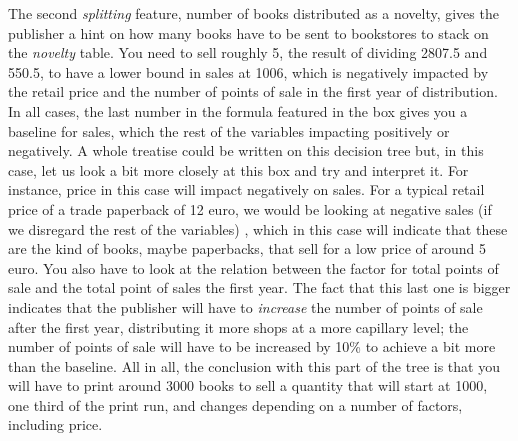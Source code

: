 \documentclass[a4paper,10pt,twocolumn,preprint,3p]{elsarticle}
\begin{document}
The second {\em splitting} feature, number of books distributed as a
novelty, gives the publisher a hint on how many books have to be sent
to bookstores to stack on the {\em novelty} table. You need to sell
roughly 5, the result of dividing 2807.5 and 550.5, to have a lower
bound in sales at 1006, which is negatively impacted by the retail
price and the number of points of sale in the first year of
distribution. In all cases, the last number in the formula featured in
the box gives you a baseline for sales, which the rest of the
variables impacting positively or negatively. A whole treatise could
be written on this decision tree but, in this case, let us look a bit
more closely at this box and try and interpret it. For instance, price
in this case will impact negatively on sales. For a typical retail
price of a trade paperback of 12 euro, we would be looking at negative
sales (if we disregard the rest of the variables) , which in this case
will indicate that these are the kind of books, maybe paperbacks, that
sell for a low price of around 5 euro. You also have to look at the
relation between the factor for total points of sale and the total
point of sales the first year. The fact that this last one is bigger
indicates that the publisher will have to {\em increase} the number of
points of sale after the first year, distributing it more shops at a
more capillary level; the number of points of sale will have to be
increased by 10\% to achieve a bit more than the baseline. All in all,
the conclusion with this part of the tree is that you will have to
print around 3000 books to sell a quantity that will start at 1000,
one third of the print run, and changes depending on a number of
factors, including price.
\end{document}
